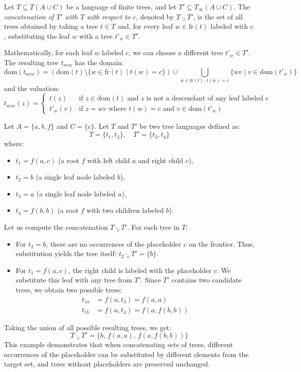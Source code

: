 \begin{definition}
Let $T \subseteq T(A \cup C)$ be a language of finite trees, and let $T' \subseteq T_\infty(A \cup C)$. The \emph{concatenation of $T'$ with $T$ with respect to $c$}, denoted by $T \cdot_c T'$, is the set of all trees obtained by taking a tree $t \in T$ and, for every leaf $w \in \text{fr}(t)$ labeled with $c$, substituting the leaf $w$ with a tree $t'_w \in T'$.

Mathematically, for each leaf $w$ labeled $c$, we can choose a different tree $t'_w \in T'$. The resulting tree $t_{new}$ has the domain:
$$\text{dom}(t_{new}) = \left( \text{dom}(t) \setminus \{ w \in \text{fr}(t) \mid t(w) = c \} \right) \cup \bigcup_{w \in \text{fr}(t), \, t(w) = c} \{ w v \mid v \in \text{dom}(t'_w) \}$$
and the valuation:
$$t_{new}(z) = \begin{cases}
t(z) & \text{if } z \in \text{dom}(t) \text{ and } z \text{ is not a descendant of any leaf labeled } c \\
t'_w(v) & \text{if } z = w v \text{ where } t(w) = c \text{ and } v \in \text{dom}(t'_w)
\end{cases}$$
\end{definition}

\begin{example}
Let $A = \{a, b, f\}$ and $C = \{c\}$. Let $T$ and $T'$ be two tree languages defined as:
$$T = \{ t_1, t_2 \}, \quad T' = \{ t_3, t_4 \}$$
where:
\begin{itemize}
    \item $t_1 = f(a, c)$ (a root $f$ with left child $a$ and right child $c$),
    \item $t_2 = b$ (a single leaf node labeled $b$),
    \item $t_3 = a$ (a single leaf node labeled $a$),
    \item $t_4 = f(b, b)$ (a root $f$ with two children labeled $b$).
\end{itemize}
Let us compute the concatenation $T \cdot_c T'$. For each tree in $T$:
\begin{itemize}
    \item For $t_2 = b$, there are no occurrences of the placeholder $c$ on the frontier. Thus, substitution yields the tree itself: $t_2 \cdot_c T' = \{b\}$.
    \item For $t_1 = f(a, c)$, the right child is labeled with the placeholder $c$. We substitute this leaf with any tree from $T'$. Since $T'$ contains two candidate trees, we obtain two possible trees:
    \begin{align*}
        t_{1a} &= f(a, t_3) = f(a, a) \\
        t_{1b} &= f(a, t_4) = f(a, f(b, b))
    \end{align*}
\end{itemize}
Taking the union of all possible resulting trees, we get:
$$T \cdot_c T' = \{ b, \, f(a, a), \, f(a, f(b, b)) \}$$
This example demonstrates that when concatenating sets of trees, different occurrences of the placeholder can be substituted by different elements from the target set, and trees without placeholders are preserved unchanged.
\end{example}

